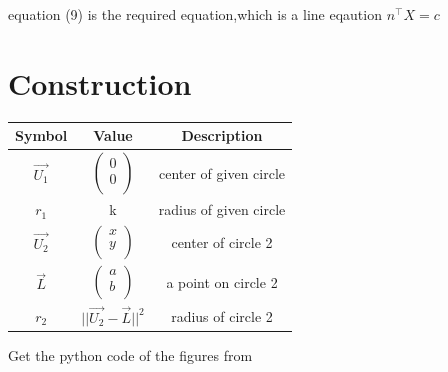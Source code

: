\documentclass[journal,12pt,twocolumn]{IEEEtran}
\begin{document}
\unboldmath 

equation (9) is the required equation,which is a line eqaution
\boldmath
${n}^{\top}X=c$
\unboldmath
\section*{Construction}
\centering
\vspace{0.2cm}
{
\setlength\extrarowheight{2pt}
\begin{tabular}{|c|c|c|}
	\hline
	\textbf{Symbol}&\textbf{Value}&\textbf{Description}\\
	\hline
	$\vec{U_1}$ & $\begin{pmatrix}0 \\ 0 \\ \end{pmatrix}$ & center of given circle\\
	\hline
	$r_1$ & k & radius of given circle\\
	\hline
	$\vec{U_2}$ & $\begin{pmatrix}x \\ y \\ \end{pmatrix}$ & center of circle 2\\
	\hline
	$\vec{L}$ & $\begin{pmatrix}a \\ b \\ \end{pmatrix}$ & a point on  circle 2\\
	\hline
	$r_2$ & $||{\vec{U_2}-\vec{L}}||^2$ & radius of circle 2\\
	\hline
\end{tabular}
}

\vspace{0.6cm}
Get the python code of the figures from
\begin{table}[h]
\large
\centering
{}


\end{table}
\end{document}
